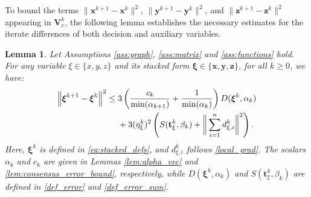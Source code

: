 \documentclass{article}
\theoremstyle{plain}
\newtheorem{lemma}[theorem]{Lemma}
\theoremstyle{definition}
\theoremstyle{remark}
\begin{document}
To bound the terms $\|\mathbf{x}^{k+1}-\mathbf{x}^{k}\|^{2}$, $\|\mathbf{y}^{k+1}-\mathbf{y}^{k}\|^{2}$, and $\|\mathbf{z}^{k+1}-\mathbf{z}^{k}\|^{2}$ appearing in $\mathbf{V}_{c}^{k}$, the following lemma establishes the necessary estimates for the iterate differences of both decision and auxiliary variables.
\begin{lemma}\label{lem:iterate_diff_bound}
    Let Assumptions \ref{ass:graph}, \ref{ass:matrix} and \ref{ass:functions} hold. For any variable $\xi \in \{x, y, z\}$ and its stacked form $\boldsymbol{\xi} \in \{\mathbf{x}, \mathbf{y}, \mathbf{z}\}$, for all $k \geq 0$, we have:
    \begin{align}
        \left\|\boldsymbol{\xi}^{k+1}-\boldsymbol{\xi}^k\right\|^{2} \leq{}& 3 \left( \frac{c_k}{\min(\alpha_{k+1})} + \frac{1}{\min(\alpha_k)} \right) D(\boldsymbol{\xi}^k, \alpha_k) \notag \\
        &+ 3(\eta_{\xi}^{k})^{2} \left( S(\mathbf{t}_{\xi}^{k},\beta_{k}) + \bigg\| \sum_{i=1}^n d_{\xi,i}^k \bigg\|^{2} \right).
    \end{align}
 Here, $\boldsymbol{\xi}^k$ is defined in \eqref{eq:stacked_defs}, and $d_{\xi,i}^k$ follows \eqref{local_grad}. The scalars  $\alpha_k$ and $c_{k}$ are given in Lemmas \ref{lem:alpha_vec} and \ref{lem:consensus_error_bound}, respectively, while $D(\boldsymbol{\xi}^k, \alpha_k)$  and $S(\mathbf{t}_{\xi}^{k},\beta_{k})$ are defined in  \eqref{def_error} and \eqref{def_error_sum}.
\end{lemma}
\end{document}
